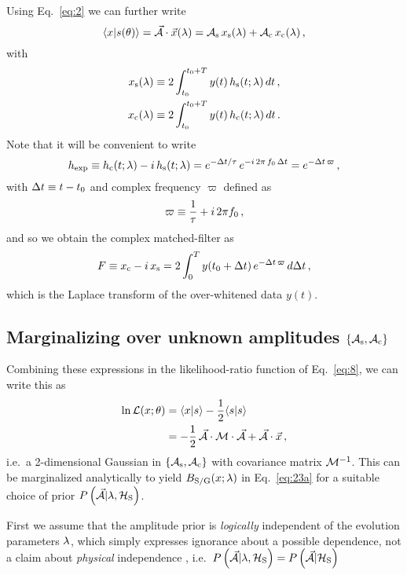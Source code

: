 \documentclass[aps,prd,onecolumn,notitlepage,nofootinbib,superscriptaddress,altaffilletter,floatfix]{revtex4-1}
\begin{document}
Using Eq.~\eqref{eq:2} we can further write
\begin{equation}
  \label{eq:9}
  \langle x|s(\theta)\rangle = \vec{\mathcal{A}}\cdot\vec{x}(\lambda) = \mathcal{A}_{\mathrm{s}}\,x_{\mathrm{s}}(\lambda) + \mathcal{A}_{\mathrm{c}}\,x_{\mathrm{c}}(\lambda)\,,
\end{equation}
with
\begin{align}
  \label{eq:10}
  x_{\mathrm{s}}(\lambda) &\equiv 2\int_{t_0}^{t_0+T} y(t)\,h_\mathrm{s}(t;\lambda)\,dt\,,\\
  x_{\mathrm{c}}(\lambda) &\equiv 2\int_{t_0}^{t_0+T} y(t)\,h_\mathrm{c}(t;\lambda)\,dt\,.
\end{align}
Note that it will be convenient to write
\begin{equation}
  \label{eq:38}
  h_{\mathrm{exp}} \equiv h_\mathrm{c}(t;\lambda) - i\,h_\mathrm{s}(t;\lambda) = e^{-\Delta t/\tau}\,e^{-i\,2\pi\,f_0\,\Delta t} = e^{-\Delta t \,\varpi}\,,
\end{equation}
with $\Delta t \equiv t - t_0$ and complex frequency $\varpi$ defined as
\begin{equation}
  \label{eq:27}
  \varpi \equiv \frac{1}{\tau} + i\,2\pi f_0\,,
\end{equation}
and so we obtain the complex matched-filter as
\begin{equation}
  \label{eq:16}
  F \equiv x_{\mathrm{c}} - i\,x_{\mathrm{s}} = 2 \int_{0}^{T} y(t_0+\Delta t)\,e^{-\Delta t \,\varpi}\,d\Delta t\,,
\end{equation}
which is the Laplace transform of the over-whitened data $y(t)$.

\subsection{Marginalizing over unknown amplitudes $\{\mathcal{A}_{\mathrm{s}},\mathcal{A}_{\mathrm{c}}\}$}
\label{sec:marg-over-unkn}

Combining these expressions in the likelihood-ratio function of Eq.~\eqref{eq:8}, we can write this as
\begin{align}
  \label{eq:21}
  \ln \mathcal{L}(x;\theta) &= \langle x|s\rangle - \frac{1}{2}\langle s|s\rangle\\
  &= -\frac{1}{2}\,\vec{\mathcal{A}}\cdot\mathcal{M}\cdot\vec{\mathcal{A}} + \vec{\mathcal{A}}\cdot\vec{x}\,,
\end{align}
i.e.\ a 2-dimensional Gaussian in $\{\mathcal{A}_{\mathrm{s}},\mathcal{A}_{\mathrm{c}}\}$ with covariance matrix $\mathcal{M}^{-1}$.
This can be marginalized analytically to yield $B_{\mathrm{S/G}}(x;\lambda)$ in Eq.~\eqref{eq:23a} for a suitable choice of prior
$P\left(\vec{\mathcal{A}}|\lambda,\mathcal{H}_{\mathrm{S}}\right)$.

First we assume that the amplitude prior is \emph{logically} independent of the evolution parameters $\lambda$, which simply expresses ignorance about a
possible dependence, not a claim about \emph{physical} independence \cite{jaynes:_logic_of_science},
i.e.\ $P\left(\vec{\mathcal{A}}|\lambda,\mathcal{H}_{\mathrm{S}}\right) = P\left(\vec{\mathcal{A}}|\mathcal{H}_{\mathrm{S}}\right)$
\end{document}
